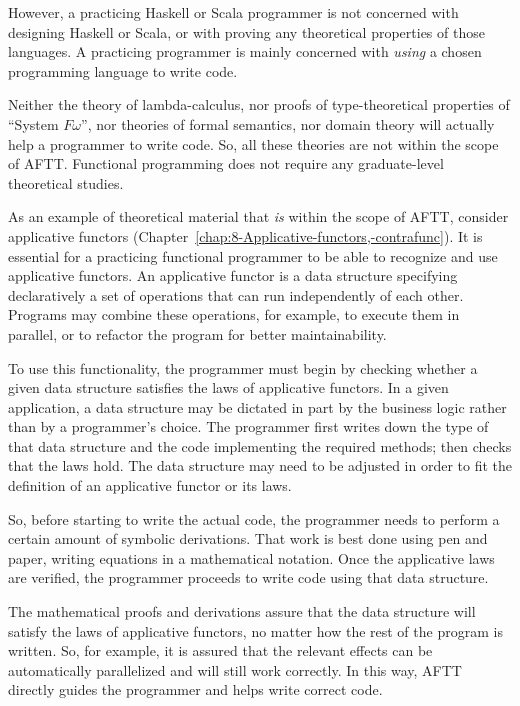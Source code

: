 However, a practicing Haskell or Scala programmer is not concerned
with designing Haskell or Scala, or with proving any theoretical properties
of those languages. A practicing programmer is mainly concerned with
\emph{using} a chosen programming language to write code. 

Neither the theory of lambda-calculus, nor proofs of type-theoretical
properties of ``System $F\omega$'', nor theories of formal semantics,
nor domain theory will actually help a programmer to write code. So,
all these theories are not within the scope of AFTT. Functional programming
does not require any graduate-level theoretical studies.

As an example of theoretical material that \emph{is} within the scope
of AFTT, consider applicative functors (Chapter~\ref{chap:8-Applicative-functors,-contrafunc}).
It is essential for a practicing functional programmer to be able
to recognize and use applicative functors. An applicative functor
is a data structure specifying declaratively a set of operations that
can run independently of each other. Programs may combine these operations,
for example, to execute them in parallel, or to refactor the program
for better maintainability.

To use this functionality, the programmer must begin by checking whether
a given data structure satisfies the laws of applicative functors.
In a given application, a data structure may be dictated in part by
the business logic rather than by a programmer's choice. The programmer
first writes down the type of that data structure and the code implementing
the required methods; then checks that the laws hold. The data structure
may need to be adjusted in order to fit the definition of an applicative
functor or its laws.

So, before starting to write the actual code, the programmer needs
to perform a certain amount of symbolic derivations. That work is
best done using pen and paper, writing equations in a mathematical
notation. Once the applicative laws are verified, the programmer proceeds
to write code using that data structure.

The mathematical proofs and derivations assure that the data structure
will satisfy the laws of applicative functors, no matter how the rest
of the program is written. So, for example, it is assured that the
relevant effects can be automatically parallelized and will still
work correctly. In this way, AFTT directly guides the programmer and
helps write correct code.

